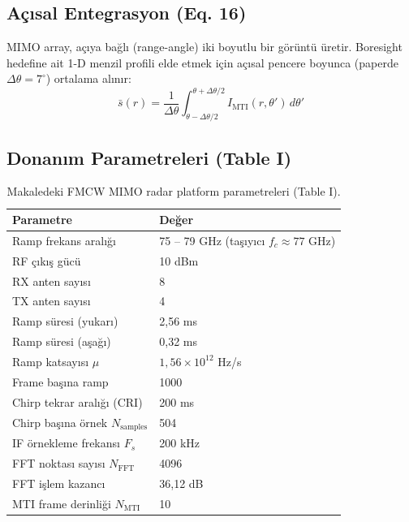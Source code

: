 \documentclass[11pt,a4paper]{article}
\begin{document}
\subsection{Açısal Entegrasyon (Eq. 16)}
MIMO array, açıya bağlı (range-angle) iki boyutlu bir görüntü üretir. Boresight hedefine ait 1-D menzil
profili elde etmek için açısal pencere boyunca (paperde $\Delta\theta = 7^\circ$) ortalama alınır:
\begin{equation}
\bar{s}(r) = \frac{1}{\Delta\theta}\int_{\theta - \Delta\theta/2}^{\theta + \Delta\theta/2} I_{\text{MTI}}(r, \theta')\, d\theta'
\end{equation}

\subsection{Donanım Parametreleri (Table I)}
\begin{table}[H]
\centering
\caption{Makaledeki FMCW MIMO radar platform parametreleri (Table I).}
\label{tab:tableI}
\begin{tabular}{ll}
\toprule
\textbf{Parametre} & \textbf{Değer} \\
\midrule
Ramp frekans aralığı & 75 -- 79 GHz (taşıyıcı $f_c \approx 77$ GHz) \\
RF çıkış gücü & 10 dBm \\
RX anten sayısı & 8 \\
TX anten sayısı & 4 \\
Ramp süresi (yukarı) & 2{,}56 ms \\
Ramp süresi (aşağı) & 0{,}32 ms \\
Ramp katsayısı $\mu$ & $1{,}56 \times 10^{12}$ Hz/s \\
Frame başına ramp & 1000 \\
Chirp tekrar aralığı (CRI) & 200 ms \\
Chirp başına örnek $N_{\text{samples}}$ & 504 \\
IF örnekleme frekansı $F_s$ & 200 kHz \\
FFT noktası sayısı $N_{\text{FFT}}$ & 4096 \\
FFT işlem kazancı & 36{,}12 dB \\
MTI frame derinliği $N_{\text{MTI}}$ & 10 \\
\bottomrule
\end{tabular}
\end{table}
\end{document}
